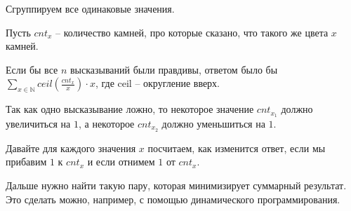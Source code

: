 \solutionSection

Сгруппируем все одинаковые значения.

Пусть $cnt_x$ -- количество камней, про которые сказано, что такого же цвета $x$ камней.

Если бы все $n$ высказываний были правдивы, ответом было бы $\sum\limits_{x \in \mathbb {N}}ceil(\frac{cnt_x}{x}) \cdot x$, где ceil -- округление вверх.

Так как одно высказывание ложно, то некоторое значение $cnt_{x_1}$ должно увеличиться на $1$,
а некоторое $cnt_{x_2}$ должно уменьшиться на $1$.

Давайте для каждого значения $x$ посчитаем, как изменится ответ, если мы прибавим $1$ к $cnt_x$
и если отнимем $1$ от $cnt_x$.

Дальше нужно найти такую пару, которая минимизирует суммарный результат.
Это сделать можно, например, с помощью динамического программирования.

\codeExample

